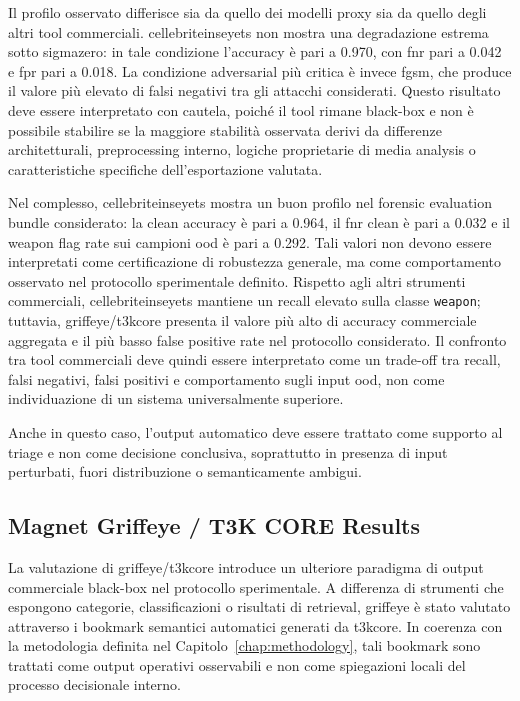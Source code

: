 Il profilo osservato differisce sia da quello dei modelli proxy sia da quello
degli altri tool commerciali. \gls{cellebriteinseyets} non mostra una
degradazione estrema sotto \gls{sigmazero}: in tale condizione l'accuracy è pari
a 0.970, con \gls{fnr} pari a 0.042 e \gls{fpr} pari a 0.018. La condizione
adversarial più critica è invece \gls{fgsm}, che produce il valore più elevato
di falsi negativi tra gli attacchi considerati. Questo risultato deve essere
interpretato con cautela, poiché il tool rimane black-box e non è possibile
stabilire se la maggiore stabilità osservata derivi da differenze
architetturali, preprocessing interno, logiche proprietarie di media analysis o
caratteristiche specifiche dell'esportazione valutata.

Nel complesso, \gls{cellebriteinseyets} mostra un buon profilo nel forensic
evaluation bundle considerato: la clean accuracy è pari a 0.964, il \gls{fnr}
clean è pari a 0.032 e il weapon flag rate sui campioni \gls{ood} è pari a
0.292. Tali valori non devono essere interpretati come certificazione di
robustezza generale, ma come comportamento osservato nel protocollo sperimentale
definito. Rispetto agli altri strumenti commerciali, \gls{cellebriteinseyets}
mantiene un recall elevato sulla classe \texttt{weapon}; tuttavia,
\gls{griffeye}/\gls{t3kcore} presenta il valore più alto di accuracy commerciale aggregata
e il più basso false positive rate nel protocollo considerato. Il confronto tra tool commerciali deve
quindi essere interpretato come un trade-off tra recall, falsi negativi, falsi
positivi e comportamento sugli input \gls{ood}, non come individuazione di un
sistema universalmente superiore.

Anche in questo caso, l'output automatico deve essere trattato come supporto al
triage e non come decisione conclusiva, soprattutto in presenza di input
perturbati, fuori distribuzione o semanticamente ambigui.


\subsection{Magnet Griffeye / T3K CORE Results}
\label{subsec:results-griffeye}

La valutazione di \gls{griffeye}/\gls{t3kcore} introduce un ulteriore paradigma
di output commerciale black-box nel protocollo sperimentale. A differenza di
strumenti che espongono categorie, classificazioni o risultati di retrieval,
\gls{griffeye} è stato valutato attraverso i bookmark semantici automatici
generati da \gls{t3kcore}. In coerenza con la metodologia definita nel
Capitolo~\ref{chap:methodology}, tali bookmark sono trattati come output
operativi osservabili e non come spiegazioni locali del processo decisionale
interno.

